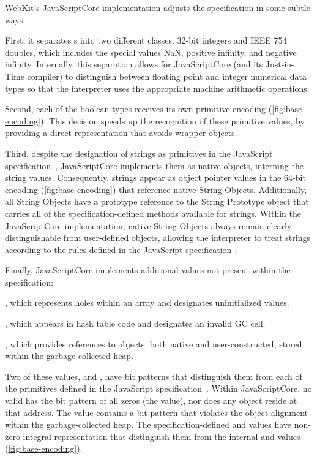 WebKit's JavaScriptCore implementation adjusts the specification in some subtle ways.

First, it separates s into two different classes: 32-bit integers and IEEE 754 doubles, which includes the special values NaN, positive infinity, and negative infinity.
Internally, this separation allows for JavaScriptCore (and its Just-in-Time compiler) to distinguish between floating point and integer numerical data types so that the interpreter uses the appropriate machine arithmetic operations.

Second, each of the boolean types receives its own primitive encoding (\autoref{fig:base-encoding}).
This decision speeds up the recognition of these primitive values, by providing a direct representation that avoids wrapper objects.

Third, despite the designation of strings as primitives in the JavaScript specification~\cite{ecma}, JavaScriptCore implements them as native objects, interning the string values.
Consequently, strings appear as object pointer values in the  64-bit encoding (\autoref{fig:base-encoding}) that reference native String Objects.
Additionally, all String Objects have a prototype reference to the String Prototype object that carries all of the specification-defined methods available for strings.
Within the JavaScriptCore implementation, native String Objects always remain clearly distinguishable from user-defined objects, allowing the interpreter to treat strings according to the rules defined in the JavaScript specification~\cite{ecma}.

Finally, JavaScriptCore implements additional values not present within the specification:
\begin{description}
  \item \textbf{}, which represents holes within an array and designates uninitialized values.
  \item \textbf{}, which appears in hash table code and designates an invalid GC cell.
  \item \textbf{}, which provides references to objects, both native and user-constructed, stored within the garbage-collected heap.
\end{description}

Two of these values,  and , have bit patterns that distinguish them from each of the primitives defined in the JavaScript specification~\cite{ecma}.
Within JavaScriptCore, no valid  has the bit pattern of all zeros (the  value), nor does any object reside at that address.
The  value contains a bit pattern that violates the object alignment within the garbage-collected heap.
The specification-defined  and  values have non-zero integral representation that distinguish them from the internal  and  values (\autoref{fig:base-encoding}).

